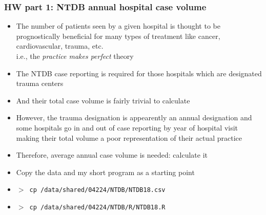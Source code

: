 \documentclass[11pt,pdftex,dvipsnames,usenames,helvetica]{beamer}
\begin{document}
\begin{frame}[fragile]
\frametitle{HW part 1: NTDB annual hospital case volume}

\begin{itemize}
\item The number of patients seen by a given hospital is thought to be
  prognostically beneficial for many types of treatment like cancer,
  cardiovascular, trauma, etc.\\
 i.e., the {\it practice makes perfect} theory
\item The NTDB case reporting is required for those hospitals which
  are designated trauma centers
\item And their total case volume is fairly trivial to calculate
\item However, the trauma designation is appearently an annual 
designation and some hospitals go in and out of case reporting by
year of hospital visit making
their total volume a poor representation of their actual practice
\item Therefore, average annual case volume is needed: calculate it
\item Copy the data and my short program as a starting point
\item {\tt $>$ cp /data/shared/04224/NTDB/NTDB18.csv $~$ }
\item {\tt $>$ cp /data/shared/04224/NTDB/R/NTDB18.R $~$ }
\end{itemize}

\end{frame}
\end{document}
